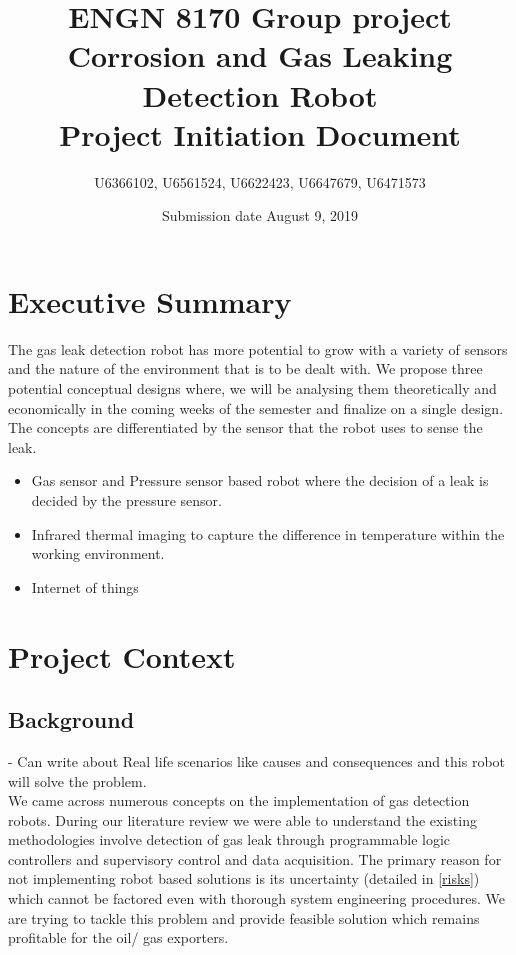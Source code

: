 \documentclass[a4paper,table]{article}
\title{ENGN 8170 Group project\\ Corrosion and Gas Leaking Detection Robot\\ Project Initiation Document}
\author{U6366102, U6561524, U6622423, U6647679, U6471573}
\date{Submission date August 9, 2019}
\begin{document}
\maketitle
\newpage
\tableofcontents
\newpage
\listoftables
\listoffigures
\newpage
{}
\section{Executive Summary}
The gas leak detection robot has more potential to grow with a variety of sensors and the nature of the environment that is to be dealt with. We propose three potential conceptual designs where, we will be analysing them theoretically and economically in the coming weeks of the semester and finalize on a single design. The concepts are differentiated by the sensor that the robot uses to sense the leak.
\begin{itemize}
    \item {Gas sensor and Pressure sensor based robot where the decision of a leak is decided by the pressure sensor.}
    \item{Infrared thermal imaging to capture the difference in temperature within the working environment.}
    \item{Internet of things} %
\end{itemize}

\section {Project Context}
\subsection{Background}
 - Can write about Real life scenarios like causes and consequences and this robot will solve the problem.\bigskip \\ 
 We came across numerous concepts on the implementation of gas detection robots. During our literature review we were able to understand the existing methodologies involve detection of gas leak through programmable logic controllers  and supervisory control and data acquisition. The primary reason for not implementing robot based solutions is its uncertainty (detailed in \ref{risks}) which cannot be factored even with thorough system engineering procedures. We are trying to tackle this problem and provide feasible solution which remains profitable for the oil/ gas exporters.
\end{document}
